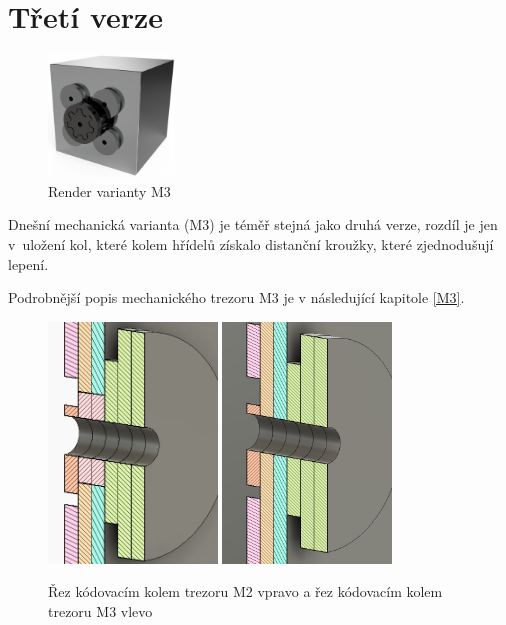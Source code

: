 \section{Třetí verze}
\label{M3-vyvoj}

\begin{figure}
    \centering
    \includegraphics[width=0.3\textwidth]{kapitoly/obrazky/M3/predni_render.png}
    \caption{Render varianty M3}
    \label{fig:M3-miny-render}
\end{figure}

Dnešní mechanická varianta (M3) je téměř stejná jako druhá verze, rozdíl je jen v~uložení kol, které kolem hřídelů získalo distanční kroužky, které
zjednodušují lepení. 

Podrobnější popis mechanického trezoru M3 je v následující kapitole \ref{M3}. 

\begin{figure}[h]
    \centering
    \vspace{40mm}
    \includegraphics[width=0.4\textwidth]{kapitoly/obrazky/M3/rez.png}
    \includegraphics[width=0.4\textwidth]{kapitoly/obrazky/M2/rez.png}
    \caption{Řez kódovacím kolem trezoru M2 vpravo a řez kódovacím kolem trezoru M3 vlevo \centering}
    \label{fig:M3-rez-kolem}
\end{figure}

\newpage